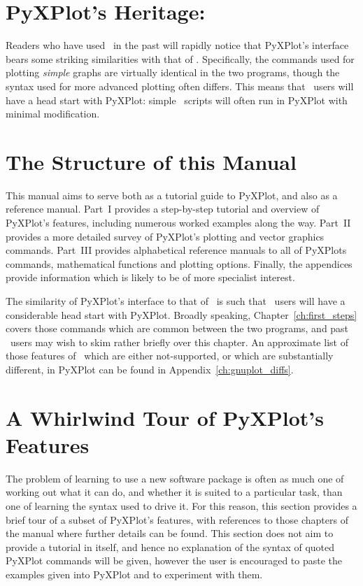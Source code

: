 \section{PyXPlot's Heritage: \gnuplot}

Readers who have used \gnuplot\ in the past will rapidly notice that PyXPlot's
interface bears some striking similarities with that of \gnuplot.
Specifically, the commands used for plotting {\it simple} graphs are virtually
identical in the two programs, though the syntax used for more advanced
plotting often differs. This means that \gnuplot\ users will have a head start
with PyXPlot: simple \gnuplot\ scripts will often run in PyXPlot with minimal
modification.

\section{The Structure of this Manual}

This manual aims to serve both as a tutorial guide to PyXPlot, and also as a
reference manual. Part~I provides a step-by-step tutorial and overview of
PyXPlot's features, including numerous worked examples along the way. Part~II
provides a more detailed survey of PyXPlot's plotting and vector graphics
commands. Part~III provides alphabetical reference manuals to all of PyXPlots
commands, mathematical functions and plotting options. Finally, the appendices
provide information which is likely to be of more specialist interest.

The similarity of PyXPlot's interface to that of \gnuplot\ is such that
\gnuplot\ users will have a considerable head start with PyXPlot.  Broadly
speaking, Chapter~\ref{ch:first_steps} covers those commands which are common
between the two programs, and past \gnuplot\ users may wish to skim rather
briefly over this chapter. An approximate list of those features of \gnuplot\
which are either not-supported, or which are substantially different, in
PyXPlot can be found in Appendix~\ref{ch:gnuplot_diffs}.

\section{A Whirlwind Tour of PyXPlot's Features}

The problem of learning to use a new software package is often as much one of
working out what it can do, and whether it is suited to a particular task, than
one of learning the syntax used to drive it. For this reason, this section
provides a brief tour of a subset of PyXPlot's features, with references to
those chapters of the manual where further details can be found. This section
does not aim to provide a tutorial in itself, and hence no explanation of the
syntax of quoted PyXPlot commands will be given, however the user is encouraged
to paste the examples given into PyXPlot and to experiment with them.

